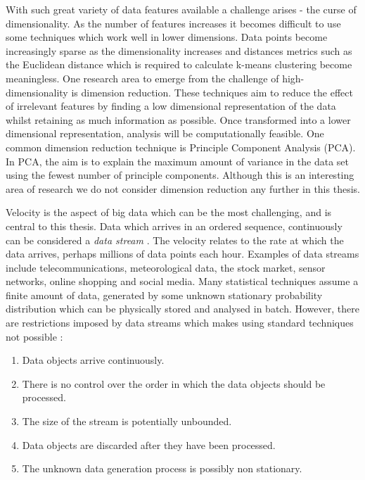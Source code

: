 With such great variety of data features available a challenge arises - the curse of dimensionality. As the number of features increases it becomes difficult to use some techniques which work well in lower dimensions. Data points become increasingly sparse as the dimensionality increases \citep{Steinbach2004} and distances metrics such as the Euclidean distance which is required to calculate k-means clustering become meaningless. One research area to emerge from the challenge of high-dimensionality is dimension reduction. These techniques aim to reduce the effect of irrelevant features by finding a low dimensional representation of the data whilst retaining as much information as possible. Once transformed into a lower dimensional representation, analysis will be computationally feasible. One common dimension reduction technique is Principle Component Analysis (PCA). In PCA, the aim is to explain the maximum amount of variance in the data set using the fewest number of principle components. Although this is an interesting area of research we do not consider dimension reduction any further in this thesis. 


Velocity is the aspect of big data which can be the most challenging, and is central to this thesis. Data which arrives in an ordered sequence, continuously can be considered a \textit{data stream} \citep{Aggarwal2007, Gama2007}. The velocity relates to the rate at which the data arrives, perhaps millions of data points each hour. Examples of data streams include telecommunications, meteorological data, the stock market, sensor networks,  online shopping and social media. Many statistical techniques assume a finite amount of data, generated by some unknown stationary probability distribution which can be physically stored and analysed in batch. However, there are restrictions imposed by data streams which makes using standard techniques not possible \citep{Silva2013}:

\begin{enumerate}
\item Data objects arrive continuously.
\item There is no control over the order in which the data objects should be processed.
\item The size of the stream is potentially unbounded.
\item Data objects are discarded after they have been processed.
\item The unknown data generation process is possibly non stationary.
\end{enumerate}

